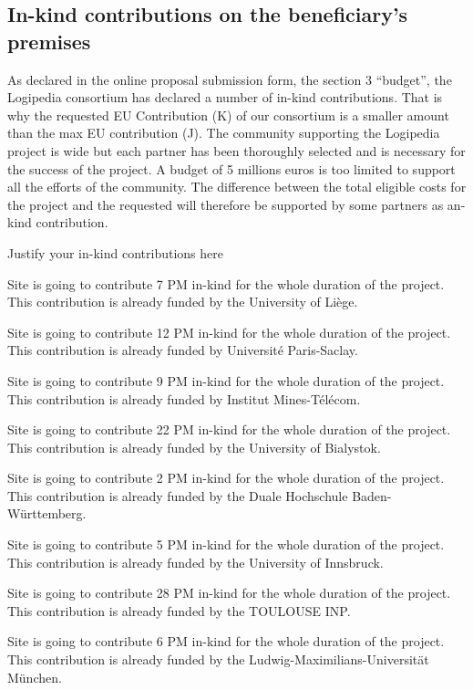 \subsection*{In-kind contributions on the beneficiary’s premises}

As declared in the online proposal submission form, the section 3
``budget'', the Logipedia consortium has declared a number of in-kind
contributions. That is why the requested EU Contribution (K) of our
consortium is a smaller amount than the max EU contribution (J). The
community supporting the Logipedia project is wide but each partner
has been thoroughly selected and is necessary for the success of the
project. A budget of 5 millions euros is too limited to support all
the efforts of the community. The difference between the total
eligible costs for the project and the requested will therefore be
supported by some partners as an-kind contribution.

{\color{red} Justify your in-kind contributions here}

Site  is going to contribute 7 PM in-kind for the whole duration of the project.
This contribution is already funded by the University of Liège.

Site  is going to contribute 12 PM in-kind for the whole duration of the project.
This contribution is already funded by Université Paris-Saclay.

Site  is going to contribute 9 PM in-kind for the whole duration of the project.
This contribution is already funded by Institut Mines-Télécom.

Site  is going to contribute 22 PM in-kind for the whole duration of the project.
This contribution is already funded by the University of Bialystok.

Site  is going to contribute 2 PM in-kind for the whole duration of the project.
This contribution is already funded by the Duale Hochschule Baden-Württemberg.

Site  is going to contribute 5 PM in-kind for the whole duration of the project.
This contribution is already funded by the University of Innsbruck.

Site  is going to contribute 28 PM in-kind for the whole duration of the project.
This contribution is already funded by the TOULOUSE INP.

Site  is going to contribute 6 PM in-kind for the whole duration of the project.
This contribution is already funded by the Ludwig-Maximilians-Universit\"at M\"unchen.

